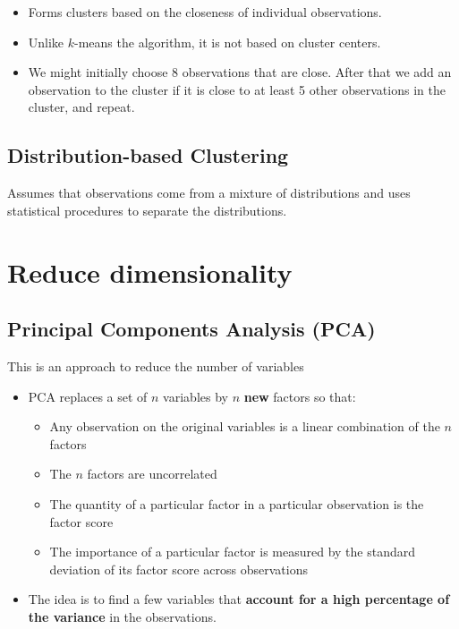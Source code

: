 \begin{itemize}
    \item Forms clusters based on the closeness of individual observations.
    \item Unlike $k$-means the algorithm, it is not based on cluster centers.
    \item We might initially choose 8 observations that are close. After that we add an observation to the cluster if it is close to at least 5 other observations in the cluster, and repeat. 
\end{itemize}

\subsection{Distribution-based Clustering}

Assumes that observations come from a mixture of distributions and uses statistical procedures to separate the distributions.

\section{Reduce dimensionality}

\subsection{Principal Components Analysis (PCA)}

This is an approach to reduce the number of variables
\begin{itemize}
    \item PCA replaces a set of $n$ variables by $n$ \textbf{new} factors so that:
          \begin{itemize}
              \item Any observation on the original variables is a linear combination of the $n$ factors
              \item The $n$ factors are uncorrelated
              \item The quantity of a particular factor in a particular observation is the factor score
              \item The importance of a particular factor is measured by the standard deviation of its factor score across observations
          \end{itemize}
    \item The idea is to find a few variables that \textbf{account for a high percentage of the variance} in the observations.
\end{itemize}

